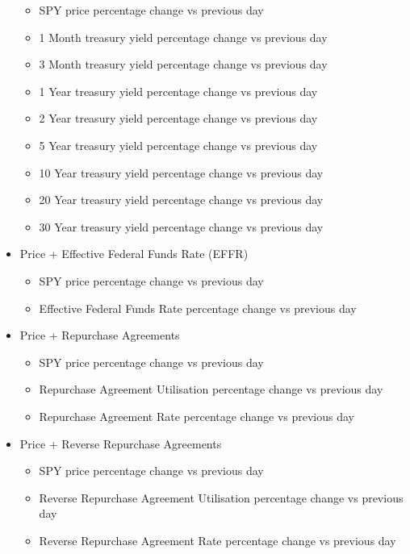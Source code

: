 \begin{itemize}
    \begin{itemize}
        \item SPY price percentage change vs previous day
        \item 1 Month treasury yield percentage change vs previous day
        \item 3 Month treasury yield percentage change vs previous day
        \item 1 Year treasury yield percentage change vs previous day
        \item 2 Year treasury yield percentage change vs previous day
        \item 5 Year treasury yield percentage change vs previous day
        \item 10 Year treasury yield percentage change vs previous day
        \item 20 Year treasury yield percentage change vs previous day
        \item 30 Year treasury yield percentage change vs previous day
    \end{itemize}
    \item Price + Effective Federal Funds Rate (EFFR)
    \begin{itemize}
        \item SPY price percentage change vs previous day
        \item Effective Federal Funds Rate percentage change vs previous day
    \end{itemize}
    \item Price + Repurchase Agreements
    \begin{itemize}
        \item SPY price percentage change vs previous day
        \item Repurchase Agreement Utilisation percentage change vs previous day
        \item Repurchase Agreement Rate percentage change vs previous day
    \end{itemize}
    \item Price + Reverse Repurchase Agreements
    \begin{itemize}
        \item SPY price percentage change vs previous day
        \item Reverse Repurchase Agreement Utilisation percentage change vs previous day
        \item Reverse Repurchase Agreement Rate percentage change vs previous day
    \end{itemize}

\end{itemize}
